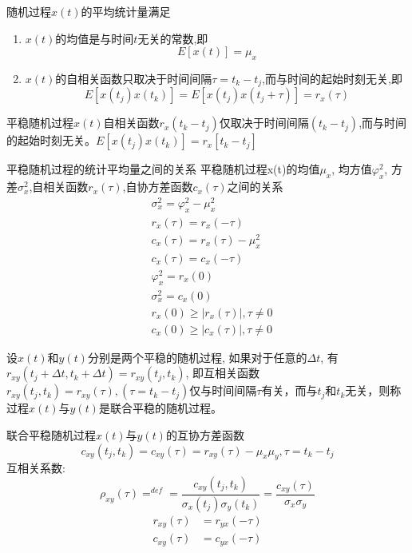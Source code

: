 \begin{frame}
\begin{definition}
	随机过程$x(t)$的平均统计量满足
	\begin{enumerate}
		\item $x(t)$的均值是与时间$t$无关的常数,即
		\[E[x(t)]=\mu_x\]
		\item $x(t)$的自相关函数只取决于时间间隔$\tau=t_k-t_j$,而与时间的起始时刻无关,即
		\[E[x(t_j)x(t_k)]=E[x(t_j)x(t_j+\tau)]=r_x(\tau) \]
	\end{enumerate}
\end{definition}
平稳随机过程$x(t)$自相关函数$r_x(t_k-t_j)$仅取决于时间间隔$(t_k-t_j)$,而与时间的起始时刻无关。$E[x(t_j)x(t_k)]=r_x[t_k-t_j]$
\end{frame}

\begin{frame}{平稳随机过程的统计平均量之间的关系}
平稳随机过程x(t)的均值$\mu_x$, 均方值$\varphi_x^2$, 方差$\sigma_x^2$,自相关函数$r_x(\tau)$,自协方差函数$c_x(\tau)$之间的关系
\begin{align*}
&\sigma_x^2=\varphi_x^2-\mu_x^2\\
&r_x(\tau)=r_x(-\tau)\\
&c_x(\tau)=r_x(\tau)-\mu_x^2\\
&c_x(\tau)=c_x(-\tau)\\
&\varphi_x^2=r_x(0)\\
&\sigma_x^2=c_x(0)\\
&r_x(0)\ge|r_x(\tau)|, \tau\ne 0\\
&c_x(0)\ge|c_x(\tau)|, \tau\ne 0
\end{align*}
\end{frame}

\begin{frame}
\begin{definition}[联合平稳随机过程]
	设$x(t)$和$y(t)$分别是两个平稳的随机过程, 如果对于任意的$\Delta t$, 有$r_{xy}(t_j+\Delta t,t_k+\Delta t)=r_{xy}(t_j,t_k)$, 即互相关函数$r_{xy}(t_j,t_k)=r_{xy}(\tau),(\tau=t_k-t_j)$仅与时间间隔$\tau$有关，而与$t_j$和$t_k$无关，则称过程$x(t)$与$y(t)$是联合平稳的随机过程。
\end{definition}
\begin{block}{联合平稳随机过程$x(t)$与$y(t)$的互协方差函数}
	\[c_{xy}(t_j,t_k)=c_{xy}(\tau)=r_{xy}(\tau)-\mu_x\mu_y, \tau=t_k-t_j\]
	互相关系数:
	\[\rho_{xy}(\tau)\mathop{=}^{def}=\frac{c_{xy}(t_j,t_k)}{\sigma_x(t_j)\sigma_y(t_k)}=\frac{c_{xy}(\tau)}{\sigma_x\sigma_y}\]
	\begin{align*}
	r_{xy}(\tau)&=r_{yx}(-\tau)\\
	c_{xy}(\tau)&=c_{yx}(-\tau)
	\end{align*}
\end{block}
\end{frame}

